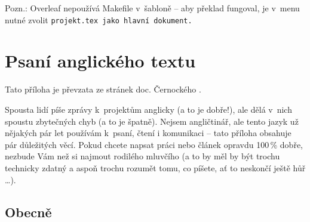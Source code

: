Pozn.: Overleaf nepoužívá Makefile v~šabloně -- aby překlad fungoval, je v~menu nutné zvolit \tt projekt.tex \rm jako hlavní dokument.

\chapter{Psaní anglického textu}
\label{anglicky}
Tato příloha je převzata ze stránek doc. Černockého \cite{CernockyEnglish}.

Spousta lidí píše zprávy k~projektům anglicky (a to je dobře!), ale dělá v~nich spoustu zbytečných chyb (a to je špatně). Nejsem angličtinář, ale tento jazyk už nějakých pár let používám k~psaní, čtení i komunikaci -- tato příloha obsahuje pár důležitých věcí. Pokud chcete napsat práci nebo článek opravdu 100\,\% dobře, nezbude Vám než si najmout rodilého mluvčího (a to by měl by být trochu technicky zdatný a aspoň trochu rozumět tomu, co píšete, ať to neskončí ještě hůř \ldots).

\section*{Obecně}

